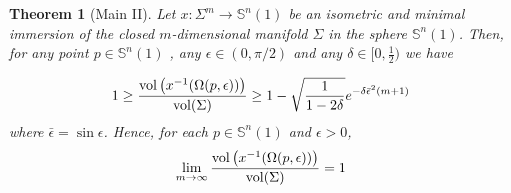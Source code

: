 \documentclass[11pt,letterpaper]{amsart}
\newtheorem{theorem}{Theorem}[section]
\theoremstyle{definition}
\theoremstyle{remark}
\newcommand{\ese}{\mathbb{S}}
\begin{document}
\begin{theorem}[Main II]\label{extconc2}
Let  $x: \Sigma^m \to \mathbb{S}^n(1)$ be an isometric and minimal immersion of the closed $m$-dimensional manifold $\Sigma$ in the sphere  $\mathbb{S}^n(1)$. Then, for any point $p \in \mathbb{S}^n(1)$ , any  $\epsilon \in (0,\pi/2)$ and any $\delta\in [0,\frac{1}{2})$ we have 

\begin{equation}\label{eq4Bis}
1\geq \frac{{\rm vol}\left(x^{-1}(\Omega(p,\epsilon))\right)}{{\rm vol}(\Sigma)}\geq  1- \sqrt{\frac{1}{1-2\delta}}e^{-\delta\bar\epsilon^2(m+1)}
\end{equation}
where $\bar\epsilon=\sin\epsilon$.  Hence, for each $p \in \ese^n(1)$ and $\epsilon>0$,
$$
\lim_{m\to\infty}\frac{{\rm vol}\left(x^{-1}(\Omega(p,\epsilon))\right)}{{\rm vol}(\Sigma)}=1
$$
\end{theorem}
\end{document}
